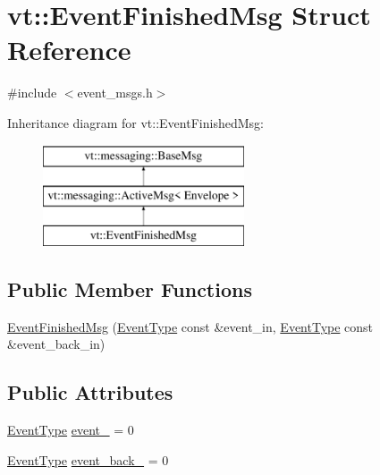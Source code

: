 \hypertarget{structvt_1_1_event_finished_msg}{}\section{vt\+:\+:Event\+Finished\+Msg Struct Reference}
\label{structvt_1_1_event_finished_msg}


{\ttfamily \#include $<$event\+\_\+msgs.\+h$>$}

Inheritance diagram for vt\+:\+:Event\+Finished\+Msg\+:\begin{figure}[H]
\begin{center}
\leavevmode
\includegraphics[height=3.000000cm]{structvt_1_1_event_finished_msg}
\end{center}
\end{figure}
\subsection*{Public Member Functions}
\begin{DoxyCompactItemize}
\item 
\hyperlink{structvt_1_1_event_finished_msg_a4f69462058e615d6465e27a14ec529b5}{Event\+Finished\+Msg} (\hyperlink{namespacevt_a009267401def7ae8bf201892222d060f}{Event\+Type} const \&event\+\_\+in, \hyperlink{namespacevt_a009267401def7ae8bf201892222d060f}{Event\+Type} const \&event\+\_\+back\+\_\+in)
\end{DoxyCompactItemize}
\subsection*{Public Attributes}
\begin{DoxyCompactItemize}
\item 
\hyperlink{namespacevt_a009267401def7ae8bf201892222d060f}{Event\+Type} \hyperlink{structvt_1_1_event_finished_msg_a76503b9f78fb92679b810d0097ca85d5}{event\+\_\+} = 0
\item 
\hyperlink{namespacevt_a009267401def7ae8bf201892222d060f}{Event\+Type} \hyperlink{structvt_1_1_event_finished_msg_a029e345a1de93af7153ca3ebf62ae659}{event\+\_\+back\+\_\+} = 0
\end{DoxyCompactItemize}

